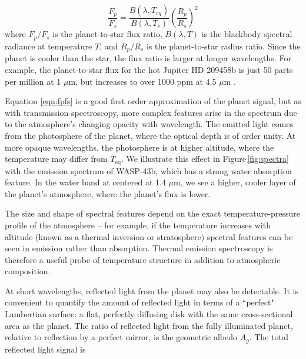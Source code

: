 \documentclass[graybox,natbib,nosecnum]{svmult}
\newcommand{\hbindex}[1]{\hl{#1}\index{#1}}  %
\begin{document}
\begin{equation}
\label{eqn:fpfs}
\frac{F_p}{F_s} = \frac{B(\lambda, T_{eq})}{B(\lambda, T_s)}\left(\frac{R_p}{R_s}\right)^2
\end{equation}
where $F_p/F_s$ is the planet-to-star flux ratio, $B(\lambda, T)$ is the blackbody spectral radiance at temperature $T$, and $R_p/R_s$ is the planet-to-star radius ratio. Since the planet is cooler than the star, the flux ratio is larger at longer wavelengths. For example, the planet-to-star flux for the hot Jupiter HD 209458b is just 50 parts per million at 1 $\mu$m, but increases to over 1000 ppm at 4.5 $\mu$m \citep{line16}.

Equation \ref{eqn:fpfs} is a good first order approximation of the planet signal, but as with transmission spectroscopy, more complex features arise in the spectrum due to the atmosphere's changing opacity with wavelength. The emitted light comes from the photosphere of the planet, where the optical depth is of order unity. At more opaque wavelengths, the photosphere is at higher altitude, where the temperature may differ from $T_\mathrm{eq}$. We illustrate this effect in Figure\,\ref{fig:spectra} with the emission spectrum of WASP-43b, which has a strong water absorption feature. In the water band at centered at 1.4 $\mu$m, we see a higher, cooler layer of the planet's atmosphere, where the planet's flux is lower.

The size and shape of spectral features depend on the exact temperature-pressure profile of the atmosphere -- for example, if the temperature increases with altitude (known as a thermal inversion or stratosphere) spectral features can be seen in emission rather than absorption. Thermal emission spectroscopy is therefore a useful probe of temperature structure in addition to atmospheric composition.


At short wavelengths, reflected light from the planet may also be detectable. It is convenient to quantify the amount of reflected light in terms of a ``perfect" Lambertian surface: a flat, perfectly diffusing disk with the same cross-sectional area as the planet. The ratio of reflected light from the fully illuminated planet, relative to reflection by a perfect mirror, is the geometric albedo $A_g$. The total reflected light signal is
\end{document}
